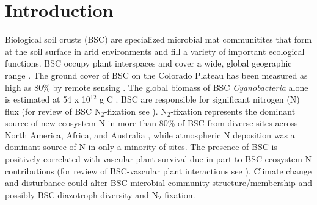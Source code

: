 \section{Introduction}
Biological soil crusts (BSC) are specialized microbial mat communitites that
form at the soil surface in arid environments and fill a variety of important
ecological functions. BSC occupy plant interspaces and cover
a wide, global geographic range \citep{garcia2003estimates}. The ground cover
of BSC on the Colorado Plateau has been measured as high as 80\% by remote
sensing \citep{karnieli2001}. The global biomass of BSC \textit{Cyanobacteria}
alone is estimated at 54 x 10$^{12}$ g C \citep{garcia2003estimates}. BSC 
are responsible for significant nitrogen (N) flux (for review of BSC
N$_{2}$-fixation see \citet{belnap2003}).  N$_{2}$-fixation represents the
dominant source of new ecosystem N in more than 80\% of BSC from diverse sites
across North America, Africa, and Australia \citep{Evans_1999}, while
atmospheric N deposition was a dominant source of N in only a minority of
sites. The presence of BSC is positively correlated with vascular plant
survival due in part to BSC ecosystem N contributions (for review of
BSC-vascular plant interactions see \citet{BelnapVascular}). Climate change and
disturbance could alter BSC microbial community structure/membership and
possibly BSC diazotroph diversity and N$_{2}$-fixation.

